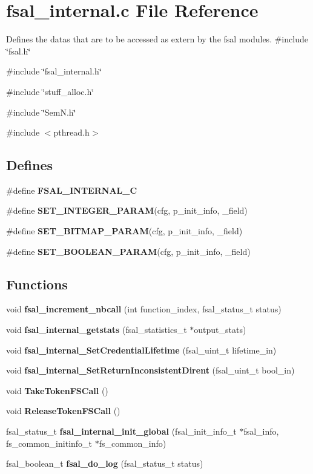 \section{fsal\_\-internal.c File Reference}
\label{fsal__internal_8c}


Defines the datas that are to be accessed as extern by the fsal modules.  
{\ttfamily \#include \char`\"{}fsal.h\char`\"{}}\par
{\ttfamily \#include \char`\"{}fsal\_\-internal.h\char`\"{}}\par
{\ttfamily \#include \char`\"{}stuff\_\-alloc.h\char`\"{}}\par
{\ttfamily \#include \char`\"{}SemN.h\char`\"{}}\par
{\ttfamily \#include $<$pthread.h$>$}\par
\subsection*{Defines}
\begin{DoxyCompactItemize}
\item 
\#define {\bfseries FSAL\_\-INTERNAL\_\-C}\label{fsal__internal_8c_acfa63689895f5e17e205bd65f0178c0d}

\item 
\#define {\bfseries SET\_\-INTEGER\_\-PARAM}(cfg, p\_\-init\_\-info, \_\-field)
\item 
\#define {\bfseries SET\_\-BITMAP\_\-PARAM}(cfg, p\_\-init\_\-info, \_\-field)
\item 
\#define {\bfseries SET\_\-BOOLEAN\_\-PARAM}(cfg, p\_\-init\_\-info, \_\-field)
\end{DoxyCompactItemize}
\subsection*{Functions}
\begin{DoxyCompactItemize}
\item 
void {\bf fsal\_\-increment\_\-nbcall} (int function\_\-index, fsal\_\-status\_\-t status)
\item 
void {\bf fsal\_\-internal\_\-getstats} (fsal\_\-statistics\_\-t $\ast$output\_\-stats)
\item 
void {\bf fsal\_\-internal\_\-SetCredentialLifetime} (fsal\_\-uint\_\-t lifetime\_\-in)
\item 
void {\bf fsal\_\-internal\_\-SetReturnInconsistentDirent} (fsal\_\-uint\_\-t bool\_\-in)
\item 
void {\bf TakeTokenFSCall} ()
\item 
void {\bfseries ReleaseTokenFSCall} ()\label{fsal__internal_8c_a3ebf10f203cc6b718170d47f661b101a}

\item 
fsal\_\-status\_\-t {\bfseries fsal\_\-internal\_\-init\_\-global} (fsal\_\-init\_\-info\_\-t $\ast$fsal\_\-info, fs\_\-common\_\-initinfo\_\-t $\ast$fs\_\-common\_\-info)\label{fsal__internal_8c_a806e3a89735ee912440d4b6e60a20dae}

\item 
fsal\_\-boolean\_\-t {\bf fsal\_\-do\_\-log} (fsal\_\-status\_\-t status)
\end{DoxyCompactItemize}
